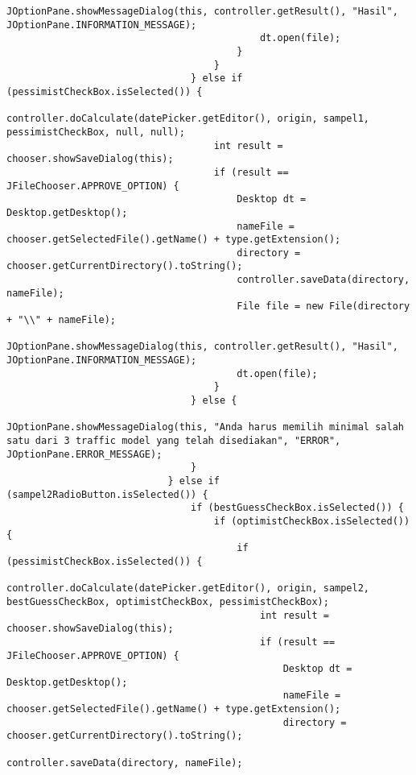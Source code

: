 \begin{lstlisting}[caption= main.java]
                                            JOptionPane.showMessageDialog(this, controller.getResult(), "Hasil", JOptionPane.INFORMATION_MESSAGE);
                                            dt.open(file);
                                        }
                                    }
                                } else if (pessimistCheckBox.isSelected()) {
                                    controller.doCalculate(datePicker.getEditor(), origin, sampel1, pessimistCheckBox, null, null);
                                    int result = chooser.showSaveDialog(this);
                                    if (result == JFileChooser.APPROVE_OPTION) {
                                        Desktop dt = Desktop.getDesktop();
                                        nameFile = chooser.getSelectedFile().getName() + type.getExtension();
                                        directory = chooser.getCurrentDirectory().toString();
                                        controller.saveData(directory, nameFile);
                                        File file = new File(directory + "\\" + nameFile);
                                        JOptionPane.showMessageDialog(this, controller.getResult(), "Hasil", JOptionPane.INFORMATION_MESSAGE);
                                        dt.open(file);
                                    }
                                } else {
                                    JOptionPane.showMessageDialog(this, "Anda harus memilih minimal salah satu dari 3 traffic model yang telah disediakan", "ERROR", JOptionPane.ERROR_MESSAGE);
                                }
                            } else if (sampel2RadioButton.isSelected()) {
                                if (bestGuessCheckBox.isSelected()) {
                                    if (optimistCheckBox.isSelected()) {
                                        if (pessimistCheckBox.isSelected()) {
                                            controller.doCalculate(datePicker.getEditor(), origin, sampel2, bestGuessCheckBox, optimistCheckBox, pessimistCheckBox);
                                            int result = chooser.showSaveDialog(this);
                                            if (result == JFileChooser.APPROVE_OPTION) {
                                                Desktop dt = Desktop.getDesktop();
                                                nameFile = chooser.getSelectedFile().getName() + type.getExtension();
                                                directory = chooser.getCurrentDirectory().toString();
                                                controller.saveData(directory, nameFile);

\end{lstlisting}
